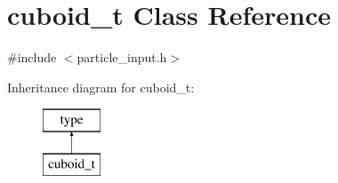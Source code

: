 \hypertarget{classcuboid__t}{}\section{cuboid\+\_\+t Class Reference}
\label{classcuboid__t}


{\ttfamily \#include $<$particle\+\_\+input.\+h$>$}

Inheritance diagram for cuboid\+\_\+t\+:\begin{figure}[H]
\begin{center}
\leavevmode
\includegraphics[height=2.000000cm]{classcuboid__t}
\end{center}
\end{figure}
